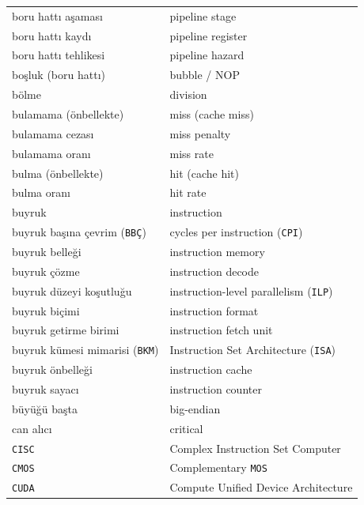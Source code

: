 {\begin{longtable}{@{}p{7.6cm}p{7.6cm}@{}}
boru hattı aşaması & pipeline stage \\
boru hattı kaydı & pipeline register \\
boru hattı tehlikesi & pipeline hazard \\
boşluk (boru hattı) & bubble / NOP \\
bölme & division \\
bulamama (önbellekte) & miss (cache miss) \\
bulamama cezası & miss penalty \\
bulamama oranı & miss rate \\
bulma (önbellekte) & hit (cache hit) \\
bulma oranı & hit rate \\
buyruk & instruction \\
buyruk başına çevrim (\texttt{BBÇ}) & cycles per instruction (\texttt{CPI}) \\
buyruk belleği & instruction memory \\
buyruk çözme & instruction decode \\
buyruk düzeyi koşutluğu & instruction-level parallelism (\texttt{ILP}) \\
buyruk biçimi & instruction format \\
buyruk getirme birimi & instruction fetch unit \\
buyruk kümesi mimarisi (\texttt{BKM}) & Instruction Set Architecture (\texttt{ISA}) \\
buyruk önbelleği & instruction cache \\
buyruk sayacı & instruction counter \\
büyüğü başta & big-endian \\

can alıcı & critical \\
\texttt{CISC} & Complex Instruction Set Computer \\
\texttt{CMOS} & Complementary \texttt{MOS} \\
\texttt{CUDA} & Compute Unified Device Architecture \\


\end{longtable}}
